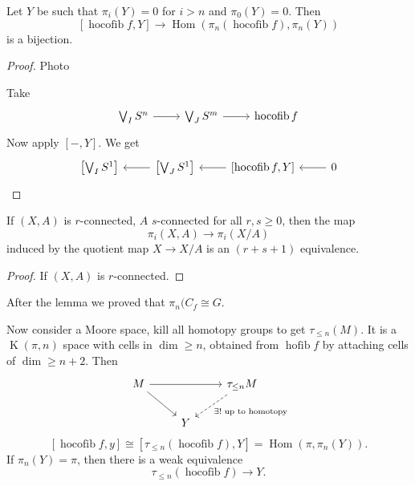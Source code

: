 \documentclass{article}
\DeclareMathOperator{\Hom}{Hom}
\DeclareMathOperator{\K}{K}
\DeclareMathOperator{\hofib}{hofib}
\DeclareMathOperator{\hocofib}{hocofib}
\begin{document}
\begin{thm}
	Let $Y$ be such that $\pi_i(Y)=0$ for $i>n$ and $\pi_0(Y)=0$. Then
	\[[\hocofib f,Y]\to\Hom(\pi_n(\hocofib f),\pi_n(Y))\]
	is a bijection.
\end{thm}
\begin{proof}
	Photo
	
	Take
	\[\begin{tikzcd}
		\bigvee_I S^n\arrow[r]&\bigvee_J S^m\arrow[r]&\hocofib f
	\end{tikzcd}\]
	Now apply $[-,Y]$. We get
	\[\begin{tikzcd}
		\left[\bigvee_I S^1\right]&\arrow[l]\left[\bigvee_J S^1\right]&\arrow[l][\hocofib f,Y]&\arrow[l]0
	\end{tikzcd}\]
\end{proof}
\begin{lemma}
	If $(X,A)$ is $r$-connected, $A$ $s$-connected for all $r,s\geq0$, then the map
	\[\pi_i(X,A)\to\pi_i(X/A)\]
	induced by the quotient map $X\to X/A$ is an $(r+s+1)$ equivalence.
\end{lemma}
\begin{proof}
	If $(X,A)$ is $r$-connected.
\end{proof}
{\color{red}After the lemma we proved that $\pi_n(C_f\cong G$.}
\begin{thm}
	Now consider a Moore space, kill all homotopy groups to get $\tau_{\leq n}(M)$. It is a $\K(\pi,n)$ space with cells in $\dim\geq n$, obtained from $\hofib f$ by attaching cells of $\dim\geq n+2$. Then
	\[\begin{tikzcd}
		M\arrow[rr]\arrow[dr]&&\tau_{\leq n}M\arrow[dl,dashed,"\exists!\text{ up to homotopy}"]\\
		&Y
	\end{tikzcd}\]
	\[[\hocofib f,y]\cong[\tau_{\leq n}(\hocofib f), Y]=\Hom(\pi,\pi_n(Y)).\]
	If $\pi_n(Y)=\pi$, then there is a weak equivalence
	\[\tau_{\leq n}(\hocofib f)\to Y.\]
\end{thm}
\end{document}
